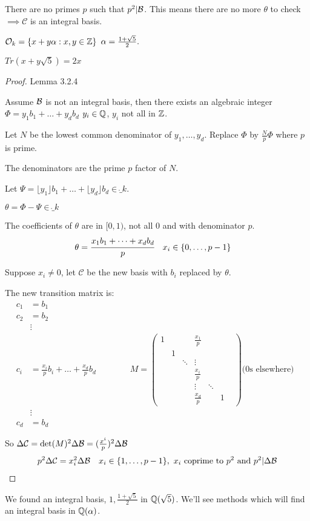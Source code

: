 \documentclass[11pt]{article}
\begin{document}
There are no primes $p$ such that $p^2 | \mathcal{B} $. This means there are no more $\theta $ to check $\implies \mathcal{C}$ is an integral basis.

$\mathcal{O}_k = \{ x+y\alpha : x,y \in \mathbb{Z} \}$ \hspace{7pt} $ \alpha = \frac{1+\sqrt5}2.$
\spa

$Tr(x+y\sqrt5) = 2x$


\begin{proof}
Lemma 3.2.4

	Assume $\mathcal{B} $ is not an integral basis, then there exists an algebraic integer $\Phi = y_1b_1 + \dots + y_db_d $\hspace{7pt}  $y_i \in \mathbb{Q}$, $y_i$ not all in $\mathbb{Z}$.
\spa

Let $N$ be the lowest common denominator of $y_1, \dots, y_d$.
	Replace $\Phi$ by $\frac{N}{p} \Phi$ where $p$ is prime.
\spa

The denominators are the prime $p$ factor of $N$. 
\spa

Let $\Psi =  \lfloor y_1 \rfloor b_1 + \dots + \lfloor y_d \rfloor b_d \in \ring_k$.
\spa

$\theta = \Phi - \Psi \in \ring_k$
\spa

	The coefficients of $\theta $ are in $[0,1)$, not all 0 and with denominator $p$.
	\begin{align*}
		\theta = \cfrac{x_1b_1 + \dots + x_db_d }{p} &&& x_i \in \{0,\dots,p-1\} 
	\end{align*}
	
	Suppose $x_i \neq 0$, let $\mathcal{C}$ be the new basis with $b_i$ replaced by $\theta$.

	The new transition matrix is:
	\begin{align*}
		c_1 &= b_1\\
		c_2 &= b_2\\
		&\vdots  \\ 
		c_i &= \frac{x_i}pb_i + \dots + \frac{x_d}pb_d
		 &&&&&M = 
		\begin{pmatrix}
			1&&&\frac{x_1}{p}&&\\
			&1&&&&\\
			&&\ddots&\vdots&&\\
			&&&\frac{x_i}{p}&&\\
			&&&\vdots&\ddots&&\\
			&&&\frac{x_d}{p}&&1
		\end{pmatrix}
		\text{(0s elsewhere) }\
		\\
		&\vdots \\
		c_d & = b_d
	\end{align*}
\spa

	So $\Delta \mathcal{C}  = \det(M)^2 \Delta \mathcal{B} = (\frac{x^i}{p})^2 \Delta \mathcal{B}$
	\begin{align*}
		p^2 \Delta \mathcal{C} = x_i^2 \Delta \mathcal{B} && x_i \in \{1,\dots, p-1 \}, \text{ } x_i \text{ coprime to } p^2 \text{ and } p^2 | \Delta \mathcal{B}
	\end{align*}
\end{proof}
\spa
We found an integral basis, $1, \frac{1+\sqrt5}{2}$ in $\mathbb{Q}(\sqrt5)$.
\spac
We'll see methods which will find an integral basis in $\mathbb{Q}(\alpha)$.
\end{document}
